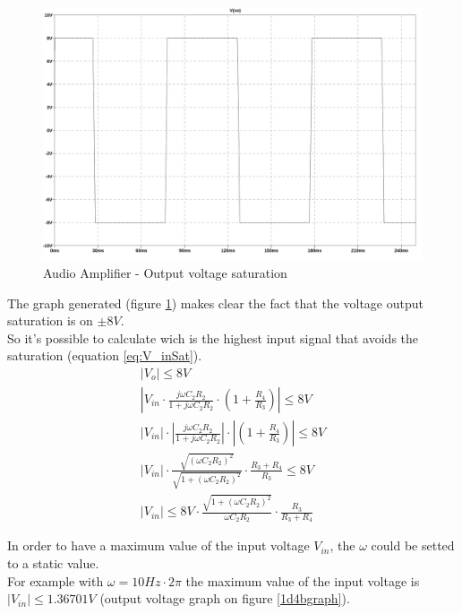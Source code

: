 \documentclass[10pt,a4paper]{book}
\begin{document}
\begin{figure}[H]
  \centering
  \includegraphics[width=14cm]{graph/1d4.jpg}
  \caption{Audio Amplifier - Output voltage saturation}
  \label{1d4graph}
\end{figure}
The graph generated (figure \ref{1d4graph}) makes clear the fact that the voltage output saturation is on $\pm8V$.\\
So it's possible to calculate wich is the highest input signal that avoids the saturation (equation \ref{eq:V_inSat}).\\

\begin{align}
  |V_o| \leq 8V \nonumber \\
  \left|V_{in}\cdot \frac{j\omega C_2R_2}{1+j\omega C_2R_2} \cdot \left(1 + \frac{R_4}{R_3} \right) \right| \leq 8V \nonumber \\
  |V_{in}|\cdot \left|\frac{j\omega C_2R_2}{1+j\omega C_2R_2} \right| \cdot \left| \left(1 + \frac{R_4}{R_3} \right) \right| \leq 8V \nonumber \\
  |V_{in}|\cdot \frac{\sqrt{(\omega C_2R_2)^2}}{\sqrt{1+(\omega C_2R_2)^2}} \cdot \frac{R_3 + R_4}{R_3} \leq 8V \nonumber \\
  |V_{in}| \leq 8V \cdot \frac{\sqrt{1+(\omega C_2R_2)^2}}{\omega C_2R_2} \cdot \frac{R_3}{R_3 + R_4} \label{eq:V_inSat}
\end{align}

In order to have a maximum value of the input voltage $V_{in}$, the $\omega$ could be setted to a static value.\\
For example with $\omega = 10Hz \cdot 2\pi$ the maximum value of the input voltage is $|V_{in}| \leq 1.36701V$ (output voltage graph on figure \ref{1d4bgraph}).
\end{document}

